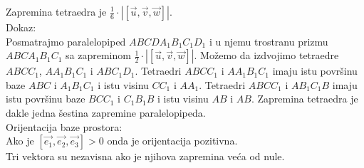 \documentclass[12pt]{article}
\newcommand{\vek}[1]{\overrightarrow{#1}}
\begin{document}
Zapremina tetraedra je $\frac{1}{6}\cdot |[\vek{u},\vek{v},\vek{w}]|$.\\
Dokaz:\\
Posmatrajmo paralelopiped $ABCDA_1B_1C_1D_1$ i u njemu trostranu prizmu $ABCA_1B_1C_1$ sa zapreminom
$\frac{1}{2}\cdot|[\vek{u},\vek{v},\vek{w}]|$. Možemo da izdvojimo tetraedre $ABCC_1$, $AA_1B_1C_1$ i $ABC_1D_1$.
Tetraedri $ABCC_1$ i $AA_1B_1C_1$ imaju istu površinu baze $ABC$ i $A_1B_1C_1$ i istu visinu $CC_1$ i $AA_1$.
Tetraedri $ABCC_1$ i $AB_1C_1B$ imaju istu površinu baze $BCC_1$ i $C_1B_1B$ i istu visinu $AB$ i $AB$.
Zapremina tetraedra je dakle jedna šestina zapremine paralelopipeda.\\
Orijentacija baze prostora:\\
Ako je $[\vek{e_1},\vek{e_2},\vek{e_3}]>0$ onda je orijentacija pozitivna.\\
Tri vektora su nezavisna ako je njihova zapremina veća od nule.
\par
\end{document}

